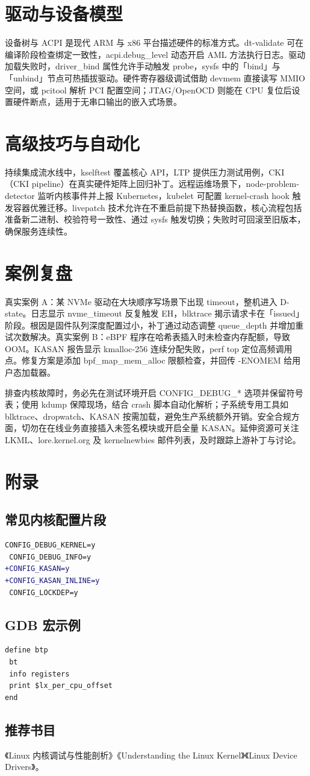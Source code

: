 \chapter{驱动与设备模型}
设备树与 ACPI 是现代 ARM 与 x86 平台描述硬件的标准方式。dt-validate 可在编译阶段检查绑定一致性，acpi.debug\_{}level 动态开启 AML 方法执行日志。驱动加载失败时，driver\_{}bind 属性允许手动触发 probe，sysfs 中的「bind」与「unbind」节点可热插拔驱动。硬件寄存器级调试借助 devmem 直接读写 MMIO 空间，或 pcitool 解析 PCI 配置空间；JTAG/OpenOCD 则能在 CPU 复位后设置硬件断点，适用于无串口输出的嵌入式场景。\par
\chapter{高级技巧与自动化}
持续集成流水线中，kselftest 覆盖核心 API，LTP 提供压力测试用例，CKI（CKI pipeline）在真实硬件矩阵上回归补丁。远程运维场景下，node-problem-detector 监听内核事件并上报 Kubernetes，kubelet 可配置 kernel-crash hook 触发容器优雅迁移。livepatch 技术允许在不重启前提下热替换函数，核心流程包括准备新二进制、校验符号一致性、通过 sysfs 触发切换；失败时可回滚至旧版本，确保服务连续性。\par
\chapter{案例复盘}
真实案例 A：某 NVMe 驱动在大块顺序写场景下出现 timeout，整机进入 D-state。日志显示 nvme\_{}timeout 反复触发 EH，blktrace 揭示请求卡在「issued」阶段。根因是固件队列深度配置过小，补丁通过动态调整 queue\_{}depth 并增加重试次数解决。真实案例 B：eBPF 程序在哈希表插入时未检查内存配额，导致 OOM。KASAN 报告显示 kmalloc-256 连续分配失败，perf top 定位高频调用点。修复方案是添加 bpf\_{}map\_{}mem\_{}alloc 限额检查，并回传 -ENOMEM 给用户态加载器。\par
排查内核故障时，务必先在测试环境开启 CONFIG\_{}DEBUG\_{}* 选项并保留符号表；使用 kdump 保障现场，结合 crash 脚本自动化解析；子系统专用工具如 blktrace、dropwatch、KASAN 按需加载，避免生产系统额外开销。安全合规方面，切勿在在线业务直接插入未签名模块或开启全量 KASAN。延伸资源可关注 LKML、lore.kernel.org 及 kernelnewbies 邮件列表，及时跟踪上游补丁与讨论。\par
\chapter{附录}
\section{常见内核配置片段}
\begin{lstlisting}[language=diff]
 CONFIG_DEBUG_KERNEL=y
 CONFIG_DEBUG_INFO=y
+CONFIG_KASAN=y
+CONFIG_KASAN_INLINE=y
 CONFIG_LOCKDEP=y
\end{lstlisting}
\section{GDB 宏示例}
\begin{lstlisting}[language=gdb]
define btp
 bt
 info registers
 print $lx_per_cpu_offset
end
\end{lstlisting}
\section{推荐书目}
《Linux 内核调试与性能剖析》《Understanding the Linux Kernel》《Linux Device Drivers》。\par

